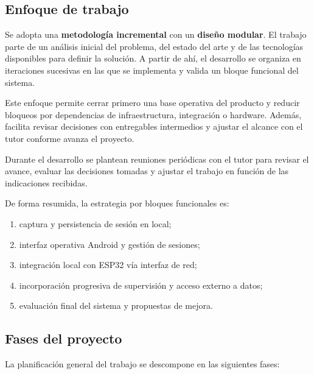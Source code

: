 \subsection{Enfoque de trabajo}

Se adopta una \textbf{metodología incremental} con un \textbf{diseño modular}. El trabajo parte de un análisis inicial del problema, del estado del arte y de las tecnologías disponibles para definir la solución. A partir de ahí, el desarrollo se organiza en iteraciones sucesivas en las que se implementa y valida un bloque funcional del sistema.

Este enfoque permite cerrar primero una base operativa del producto y reducir bloqueos por dependencias de infraestructura, integración o hardware. Además, facilita revisar decisiones con entregables intermedios y ajustar el alcance con el tutor conforme avanza el proyecto.

Durante el desarrollo se plantean reuniones periódicas con el tutor para revisar el avance, evaluar las decisiones tomadas y ajustar el trabajo en función de las indicaciones recibidas.

De forma resumida, la estrategia por bloques funcionales es:

\begin{enumerate}
  \item captura y persistencia de sesión en local;
  \item interfaz operativa Android y gestión de sesiones;
  \item integración local con ESP32 vía interfaz de red;
  \item incorporación progresiva de supervisión y acceso externo a datos;
  \item evaluación final del sistema y propuestas de mejora.
\end{enumerate}

\subsection{Fases del proyecto}

La planificación general del trabajo se descompone en las siguientes fases:

